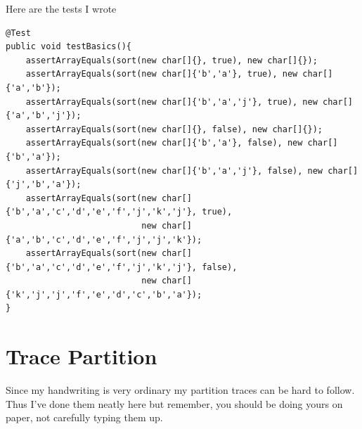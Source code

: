 \documentclass[twoside=false,DIV=14]{scrartcl}
\begin{document}
Here are the tests I wrote

{\small
\begin{lstlisting}
@Test
public void testBasics(){
    assertArrayEquals(sort(new char[]{}, true), new char[]{});
    assertArrayEquals(sort(new char[]{'b','a'}, true), new char[]{'a','b'});
    assertArrayEquals(sort(new char[]{'b','a','j'}, true), new char[]{'a','b','j'});
    assertArrayEquals(sort(new char[]{}, false), new char[]{});
    assertArrayEquals(sort(new char[]{'b','a'}, false), new char[]{'b','a'});
    assertArrayEquals(sort(new char[]{'b','a','j'}, false), new char[]{'j','b','a'});
    assertArrayEquals(sort(new char[]{'b','a','c','d','e','f','j','k','j'}, true),
                           new char[]{'a','b','c','d','e','f','j','j','k'});
    assertArrayEquals(sort(new char[]{'b','a','c','d','e','f','j','k','j'}, false),
                           new char[]{'k','j','j','f','e','d','c','b','a'});
}
\end{lstlisting}
}

\section{Trace Partition}
Since my handwriting is very ordinary my partition traces can be hard to follow.  Thus I've done them neatly here but remember, you should be doing yours on paper, not carefully typing them up.
\end{document}
